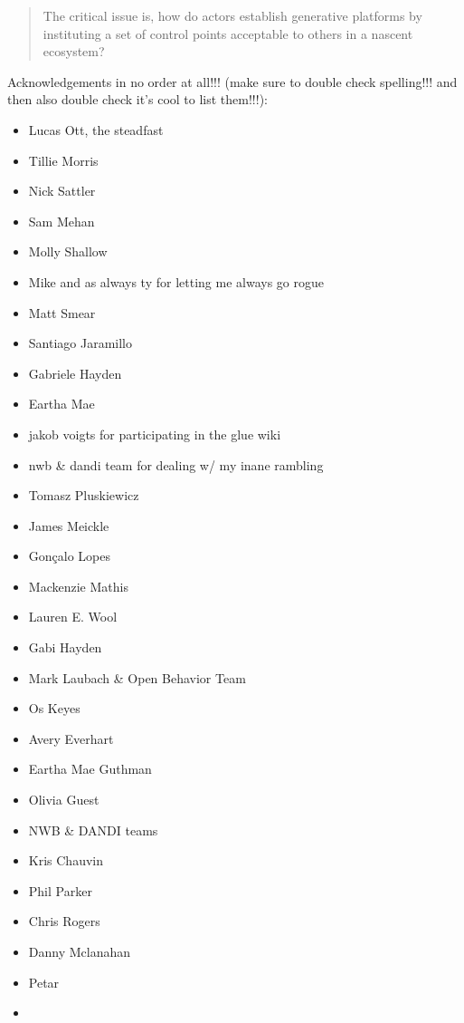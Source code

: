 \documentclass[10pt]{article}
\begin{document}
\begin{quote}
The critical issue is, how do actors establish generative platforms by
instituting a set of control points acceptable to others in a nascent
ecosystem? \cite{tilsonDigitalInfrastructuresMissing2010} 
\end{quote}

Acknowledgements in no order at all!!! (make sure to double check
spelling!!! and then also double check it's cool to list them!!!):

\begin{itemize}

\item
  Lucas Ott, the steadfast
\item
  Tillie Morris
\item
  Nick Sattler
\item
  Sam Mehan
\item
  Molly Shallow
\item
  Mike and as always ty for letting me always go rogue
\item
  Matt Smear
\item
  Santiago Jaramillo
\item
  Gabriele Hayden
\item
  Eartha Mae
\item
  jakob voigts for participating in the glue wiki
\item
  nwb \& dandi team for dealing w/ my inane rambling
\item
  Tomasz Pluskiewicz
\item
  James Meickle
\item
  Gonçalo Lopes
\item
  Mackenzie Mathis
\item
  Lauren E. Wool
\item
  Gabi Hayden
\item
  Mark Laubach \& Open Behavior Team
\item
  Os Keyes
\item
  Avery Everhart
\item
  Eartha Mae Guthman
\item
  Olivia Guest
\item
  NWB \& DANDI teams
\item
  Kris Chauvin
\item
  Phil Parker
\item
  Chris Rogers
\item
  Danny Mclanahan
\item
  Petar
\item

\end{itemize}
\end{document}
